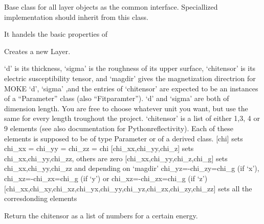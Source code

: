 \documentclass[letterpaper,10pt,english]{sphinxmanual}
\begin{document}
\begin{fulllineitems}
\label{\detokenize{modules-api/samplerepresentation:SampleRepresentation.LayerObject}}
Base class for all layer objects as the common interface. Speciallized implementation should inherit from this class.

It handels the basic properties of

\begin{fulllineitems}
\label{\detokenize{modules-api/samplerepresentation:SampleRepresentation.LayerObject.__init__}}
Creates a new Layer.

‘d’ is its thickness, ‘sigma’ is the roughness of its upper surface, ‘chitensor’ is its electric susceptibility tensor, and ‘magdir’ gives the magnetization directrion for MOKE
‘d’, ‘sigma’ ,and the entries of ‘chitensor’ are expected to be an instances of a “Parameter” class (also “Fitparamter”).
‘d’ and ‘sigma’ are both of dimension length. You are free to choose whatever unit you want, but use the same for every length troughout the project.
‘chitensor’ is a list of either  1,3, 4 or 9 elements (see also documentation for Pythonreflectivity). Each of these elements is supposed to be of type Parameter or of a derived class.
{[}chi{]} sets chi\_xx = chi\_yy = chi\_zz = chi
{[}chi\_xx,chi\_yy,chi\_z{]} sets  chi\_xx,chi\_yy,chi\_zz, others are zero
{[}chi\_xx,chi\_yy,chi\_z,chi\_g{]} sets  chi\_xx,chi\_yy,chi\_zz and depending on ‘magdir’ chi\_yz=-chi\_zy=chi\_g (if ‘x’), chi\_xz=-chi\_zx=chi\_g (if ‘y’) or chi\_xz=-chi\_zx=chi\_g (if ‘z’)
{[}chi\_xx,chi\_xy,chi\_xz,chi\_yx,chi\_yy,chi\_yz,chi\_zx,chi\_zy,chi\_zz{]} sets all the corresdonding elements

\end{fulllineitems}


\begin{fulllineitems}
\label{\detokenize{modules-api/samplerepresentation:SampleRepresentation.LayerObject.getChi}}
Return the chitensor as a list of numbers for a certain energy.


\end{fulllineitems}
\end{fulllineitems}
\end{document}
